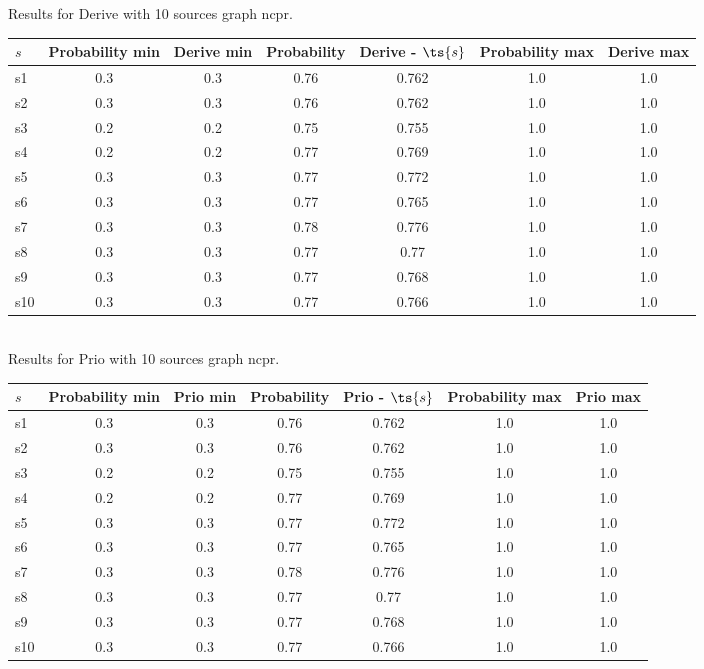 \documentclass{article}
\begin{document}
\noindent Results for Derive with 10 sources graph ncpr.

\noindent\begin{tabular}{|l|c|c|c|c|c|c|}
\hline
$s$& Probability min & Derive min & Probability & Derive - $\ts{s}$ & Probability max & Derive max\\
\hline
s1 &0.3 & 0.3 & 0.76 & 0.762 & 1.0 & 1.0\\
\hline
s2 &0.3 & 0.3 & 0.76 & 0.762 & 1.0 & 1.0\\
\hline
s3 &0.2 & 0.2 & 0.75 & 0.755 & 1.0 & 1.0\\
\hline
s4 &0.2 & 0.2 & 0.77 & 0.769 & 1.0 & 1.0\\
\hline
s5 &0.3 & 0.3 & 0.77 & 0.772 & 1.0 & 1.0\\
\hline
s6 &0.3 & 0.3 & 0.77 & 0.765 & 1.0 & 1.0\\
\hline
s7 &0.3 & 0.3 & 0.78 & 0.776 & 1.0 & 1.0\\
\hline
s8 &0.3 & 0.3 & 0.77 & 0.77 & 1.0 & 1.0\\
\hline
s9 &0.3 & 0.3 & 0.77 & 0.768 & 1.0 & 1.0\\
\hline
s10 &0.3 & 0.3 & 0.77 & 0.766 & 1.0 & 1.0\\
\hline
\end{tabular}\\

\noindent Results for Prio with 10 sources graph ncpr.

\noindent\begin{tabular}{|l|c|c|c|c|c|c|}
\hline
$s$& Probability min & Prio min & Probability & Prio - $\ts{s}$ & Probability max & Prio max\\
\hline
s1 &0.3 & 0.3 & 0.76 & 0.762 & 1.0 & 1.0\\
\hline
s2 &0.3 & 0.3 & 0.76 & 0.762 & 1.0 & 1.0\\
\hline
s3 &0.2 & 0.2 & 0.75 & 0.755 & 1.0 & 1.0\\
\hline
s4 &0.2 & 0.2 & 0.77 & 0.769 & 1.0 & 1.0\\
\hline
s5 &0.3 & 0.3 & 0.77 & 0.772 & 1.0 & 1.0\\
\hline
s6 &0.3 & 0.3 & 0.77 & 0.765 & 1.0 & 1.0\\
\hline
s7 &0.3 & 0.3 & 0.78 & 0.776 & 1.0 & 1.0\\
\hline
s8 &0.3 & 0.3 & 0.77 & 0.77 & 1.0 & 1.0\\
\hline
s9 &0.3 & 0.3 & 0.77 & 0.768 & 1.0 & 1.0\\
\hline
s10 &0.3 & 0.3 & 0.77 & 0.766 & 1.0 & 1.0\\
\hline
\end{tabular}\\
\end{document}
